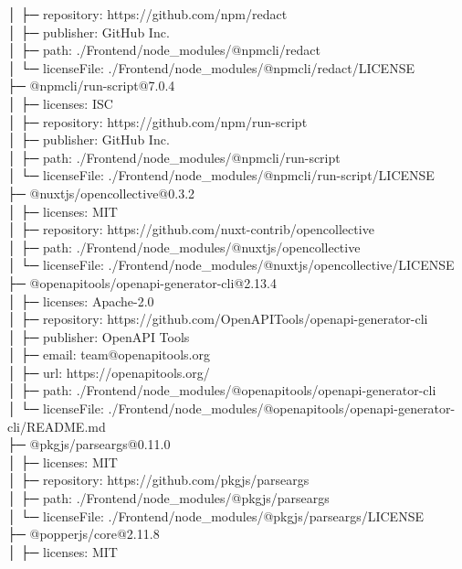 │  ├─ repository: https://github.com/npm/redact\\
│  ├─ publisher: GitHub Inc.\\
│  ├─ path: ./Frontend/node\_modules/@npmcli/redact\\
│  └─ licenseFile: ./Frontend/node\_modules/@npmcli/redact/LICENSE\\
├─ @npmcli/run-script@7.0.4\\
│  ├─ licenses: ISC\\
│  ├─ repository: https://github.com/npm/run-script\\
│  ├─ publisher: GitHub Inc.\\
│  ├─ path: ./Frontend/node\_modules/@npmcli/run-script\\
│  └─ licenseFile: ./Frontend/node\_modules/@npmcli/run-script/LICENSE\\
├─ @nuxtjs/opencollective@0.3.2\\
│  ├─ licenses: MIT\\
│  ├─ repository: https://github.com/nuxt-contrib/opencollective\\
│  ├─ path: ./Frontend/node\_modules/@nuxtjs/opencollective\\
│  └─ licenseFile: ./Frontend/node\_modules/@nuxtjs/opencollective/LICENSE\\
├─ @openapitools/openapi-generator-cli@2.13.4\\
│  ├─ licenses: Apache-2.0\\
│  ├─ repository: https://github.com/OpenAPITools/openapi-generator-cli\\
│  ├─ publisher: OpenAPI Tools\\
│  ├─ email: team@openapitools.org\\
│  ├─ url: https://openapitools.org/\\
│  ├─ path: ./Frontend/node\_modules/@openapitools/openapi-generator-cli\\
│  └─ licenseFile: ./Frontend/node\_modules/@openapitools/openapi-generator-cli/README.md\\
├─ @pkgjs/parseargs@0.11.0\\
│  ├─ licenses: MIT\\
│  ├─ repository: https://github.com/pkgjs/parseargs\\
│  ├─ path: ./Frontend/node\_modules/@pkgjs/parseargs\\
│  └─ licenseFile: ./Frontend/node\_modules/@pkgjs/parseargs/LICENSE\\
├─ @popperjs/core@2.11.8\\
│  ├─ licenses: MIT\\
